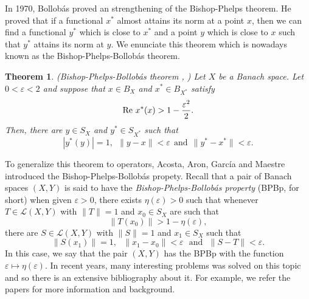 \documentclass[12pt,a4paper]{amsart}
\newtheorem{theorem}{Theorem}[section]
\theoremstyle{definition}
\newcommand{\e}{\varepsilon}
\DeclareMathOperator{\re}{Re}
\numberwithin{equation}{section}
\def\re{\hbox{\rm Re~}}
\begin{document}
In 1970, Bollob\'as \cite{Bol} proved an strengthening of the Bishop-Phelps theorem. He proved that if a functional $x^*$ almost attains its norm at a point $x$, then we can find a  functional $y^*$ which is close to $x^*$ and a point $y$ which is close to $x$ such that $y^*$ attains its norm at $y$. We enunciate this theorem which is nowadays known as the Bishop-Phelps-Bollob\'as theorem.

\begin{theorem} \emph{(Bishop-Phelps-Bollob\'as theorem \cite{Bol}, \cite[Corollary 2.4]{CKMM})} Let $X$ be a Banach space. Let $0<\e <2$ and suppose that $x \in B_X$ and $x^* \in B_{X^*}$ satisfy
\begin{equation*}
\re x^*(x) > 1 - \frac{\e^2}{2}.
\end{equation*}
Then, there are $y \in S_X$ and $y^* \in S_{X^*}$ such that
\begin{equation*}
|y^*(y)| = 1, \ \ \|y - x\| < \e \ \ \mbox{and} \ \ \|y^* - x^*\| < \e.
\end{equation*}
\end{theorem}	
To generalize this theorem to operators, Acosta, Aron, Garc\'ia and Maestre introduced the Bishop-Phelps-Bollob\'as propety. Recall that  a pair of Banach spaces $(X, Y)$ is said to have the {\it Bishop-Phelps-Bollob\'as property} (BPBp, for short) when given $\e > 0$, there exists $\eta(\e) > 0$ such that whenever $T \in \mathcal{L}(X, Y)$ with $\|T\| = 1$ and $x_0 \in S_X$ are such that
\begin{equation*}
\|T(x_0)\| > 1 - \eta(\e),
\end{equation*}
there are $S \in \mathcal{L}(X, Y)$ with $\|S\| = 1$ and $x_1 \in S_X$ such that
\begin{equation*}
\|S(x_1)\| = 1, \ \ \ \|x_1 - x_0\| < \e \ \ \ \mbox{and} \ \ \ \|S - T\| < \e.
\end{equation*}
In this case, we say that the pair $(X, Y)$ has the BPBp with the function $\e \longmapsto \eta(\e)$. In recent years, many interesting problems was solved on this topic and so there is an extensive bibliography about it. For example, we refer the papers \cite{AAGM, ABGM, ACK, ACKLM, CGK, CKMM, CS, Dantas, KL, Martin} for more information and background. 
\end{document}
